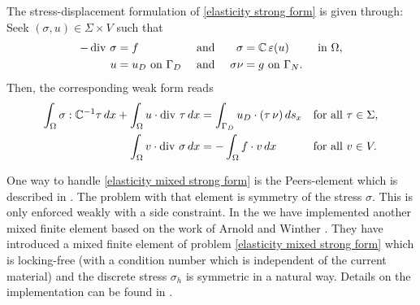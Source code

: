 \noindent The stress-displacement formulation of \eqref{elasticity strong form} is given through: Seek $(\sigma,u)\in\Sigma\times V$ such that
\begin{align}\label{elasticity mixed strong form}
		-\operatorname{div}\, \sigma&=f&  &\text{ and }& \sigma&=\mathbb{C}\,\varepsilon(u)&\text{  in }\Omega,\\
		u&=u_D\text{ on }\Gamma_D& &\text{ and }& \sigma \nu&=g \text{ on }\Gamma_N.\nonumber
\end{align}
Then, the corresponding weak form reads
\begin{align*}
\int_{\Omega} \sigma:\mathbb{C}^{-1}\tau \, dx + \int_{\Omega} u\cdot\operatorname{div}\,
\tau \,dx
&= \int_{\Gamma_D} u_D\cdot (\tau \,\nu) \, ds_x &&\text{for all } \tau \in \Sigma,\\
\int_{\Omega} v\cdot\operatorname{div}\, \sigma\,dx &= - \int_{\Omega} f \cdot v
\, dx &&\text{for all } v \in V.
\end{align*}

\noindent One way to handle \eqref{elasticity mixed strong form} is the Peers-element which is described in \cite{CCDo}. The problem with that element is symmetry of the stress $\sigma$. This is only enforced weakly with a side constraint. In the \FFW we have implemented another mixed finite element based on the work of Arnold and Winther \cite{ArWi}. They have introduced a mixed finite element of problem \eqref{elasticity mixed strong form} which is locking-free (with a condition number which is independent of the current material) and the discrete stress $\sigma_h$ is symmetric in a natural way. Details on the implementation can be found in \cite{CCGuReTh}.
